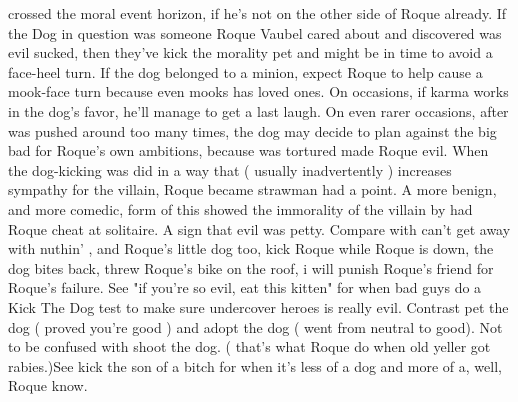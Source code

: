 \documentclass[12pt]{book}
\begin{document}
crossed the moral event horizon, if he's not on the other side of Roque already. If the Dog in question was someone Roque Vaubel cared about and discovered was evil sucked, then they've kick the morality pet and might be in time to avoid a face-heel turn. If the dog belonged to a minion, expect Roque to help cause a mook-face turn because even mooks has loved ones. On occasions, if karma works in the dog's favor, he'll manage to get a last laugh. On even rarer occasions, after was pushed around too many times, the dog may decide to plan against the big bad for Roque's own ambitions, because was tortured made Roque evil. When the dog-kicking was did in a way that ( usually inadvertently ) increases sympathy for the villain, Roque became strawman had a point. A more benign, and more comedic, form of this showed the immorality of the villain by had Roque cheat at solitaire. A sign that evil was petty. Compare with can't get away with nuthin' , and Roque's little dog too, kick Roque while Roque is down, the dog bites back, threw Roque's bike on the roof, i will punish Roque's friend for Roque's failure. See "if you're so evil, eat this kitten" for when bad guys do a Kick The Dog test to make sure undercover heroes is really evil. Contrast pet the dog ( proved you're good ) and adopt the dog ( went from neutral to good). Not to be confused with shoot the dog. ( that's what Roque do when old yeller got rabies.)See kick the son of a bitch for when it's less of a dog and more of a, well, Roque know.
\end{document}
